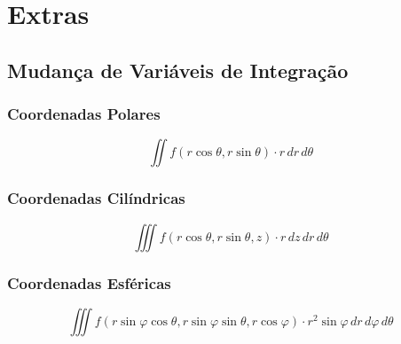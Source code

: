 \documentclass[11pt, a4paper]{article}
\begin{document}
\newpage

\section{Extras}

\subsection{Mudança de Variáveis de Integração}

\subsubsection{Coordenadas Polares}

\begin{equation*}
    \iint f(r\cos\theta, r\sin\theta) \cdot r\,dr\,d\theta
\end{equation*}

\subsubsection{Coordenadas Cilíndricas}

\begin{equation*}
    \iiint f(r\cos\theta, r\sin\theta, z) \cdot r\,dz\,dr\,d\theta
\end{equation*}

\subsubsection{Coordenadas Esféricas}

\begin{equation*}
    \iiint f(r\sin\varphi\cos\theta, r\sin\varphi\sin\theta, r\cos\varphi) \cdot r^2\sin\varphi\,dr\,d\varphi\,d\theta
\end{equation*}
\end{document}
